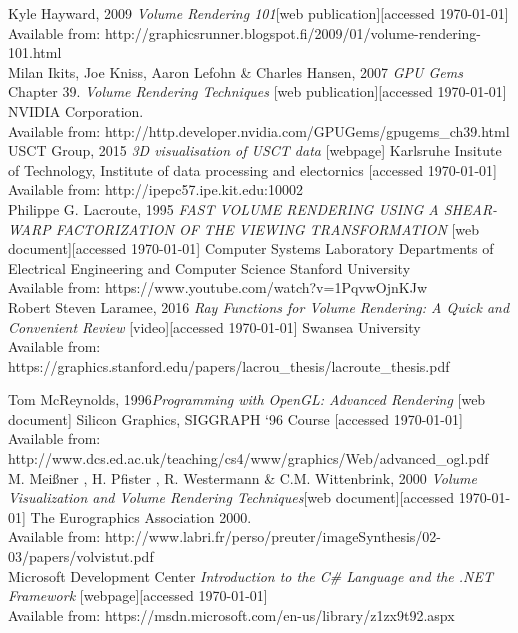 \documentclass[twoside, english, 11pt]{report}
\begin{document}
\small Kyle Hayward, 2009 \textit{Volume Rendering 101}[web publication][accessed \today]
Available from: http://graphicsrunner.blogspot.fi/2009/01/volume-rendering-101.html\\

\small Milan Ikits, Joe Kniss, Aaron Lefohn \& Charles Hansen, 2007 \textit{GPU Gems} Chapter 39. \textit{Volume Rendering Techniques} [web publication][accessed \today] NVIDIA Corporation.\\
Available from: http://http.developer.nvidia.com/GPUGems/gpugems\_ch39.html\\

\small USCT Group, 2015 \textit{3D visualisation of USCT data} [webpage] Karlsruhe Insitute of Technology, Institute of data processing and electornics [accessed \today] \\
Available from: http://ipepc57.ipe.kit.edu:10002\\

\small Philippe G. Lacroute, 1995 \textit{FAST VOLUME RENDERING USING A SHEAR-WARP FACTORIZATION OF THE VIEWING TRANSFORMATION} [web document][accessed \today] Computer Systems Laboratory
Departments of Electrical Engineering and Computer Science Stanford University \\
Available from: https://www.youtube.com/watch?v=1PqvwOjnKJw\\

\small Robert Steven Laramee, 2016 \textit{Ray Functions for Volume Rendering: A Quick and Convenient Review} [video][accessed \today] Swansea University \\
Available from: https://graphics.stanford.edu/papers/lacrou\_thesis/lacroute\_thesis.pdf\

\small Tom McReynolds, 1996\textit{Programming with OpenGL: Advanced Rendering} [web document] Silicon Graphics, SIGGRAPH ‘96 Course [accessed \today] \\
Available from: http://www.dcs.ed.ac.uk/teaching/cs4/www/graphics/Web/advanced\_ogl.pdf\\

\small M. Meißner , H. Pfister , R. Westermann \& C.M. Wittenbrink, 2000 \textit{Volume Visualization and Volume Rendering Techniques}[web document][accessed \today] The Eurographics Association 2000.\\
Available from: http://www.labri.fr/perso/preuter/imageSynthesis/02-03/papers/volvistut.pdf\\

\small Microsoft Development Center \textit{Introduction to the C\# Language and the .NET Framework} [webpage][accessed \today] \\
Available from: https://msdn.microsoft.com/en-us/library/z1zx9t92.aspx\\
\end{document}
